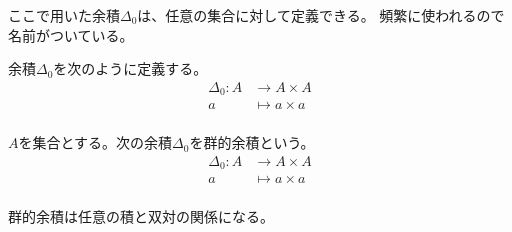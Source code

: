 ここで用いた余積$\Delta_0$は、任意の集合に対して定義できる。
頻繁に使われるので名前がついている。

余積$\Delta_0$を次のように定義する。
\begin{equation}\begin{split} %
	\Delta_0:A &\to A \times A \\
		a &\mapsto a \times a \\
\end{split}\end{equation} %

\begin{definition}[群的余積]\label{def:群的余積} %
$A$を集合とする。次の余積$\Delta_0$を群的余積という。
\begin{equation}\begin{split} %
	\Delta_0: A &\to A \times A \\
		a &\mapsto a \times a \\
\end{split}\end{equation} %
\end{definition} %

群的余積は任意の積と双対の関係になる。

